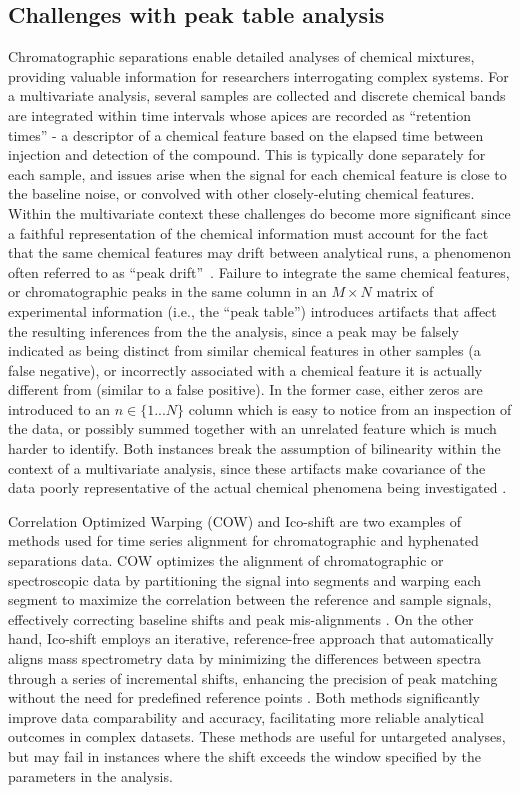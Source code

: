 \documentclass[preprint,12pt]{elsarticle}
\begin{document}
\subsection{Challenges with peak table analysis}
Chromatographic separations enable detailed analyses of chemical mixtures, providing valuable information for researchers interrogating complex systems. For a multivariate analysis, several samples are collected and discrete chemical bands are integrated within time intervals whose apices are recorded as ``retention times'' - a descriptor of a chemical feature based on the elapsed time between injection and detection of the compound. This is typically done separately for each sample, and issues arise when the signal for each chemical feature is close to the baseline noise, or convolved with other closely-eluting chemical features. Within the multivariate context these challenges do become more significant since a faithful representation of the chemical information must account for the fact that the same chemical features may drift between analytical runs, a phenomenon often referred to as ``peak drift''~\cite{christensen2005chromatographic}. Failure to integrate the same chemical features, or chromatographic peaks in the same column in an $M \times N$ matrix of experimental information (i.e., the ``peak table'') introduces artifacts that affect the resulting inferences from the the analysis, since a peak may be falsely indicated as being distinct from similar chemical features in other samples (a false negative), or incorrectly associated with a chemical feature it is actually different from (similar to a false positive). In the former case, either zeros are introduced to an $n \in \{1...N\}$ column which is easy to notice from an inspection of the data, or possibly summed together with an unrelated feature which is much harder to identify. Both instances break the assumption of bilinearity within the context of a multivariate analysis, since these artifacts make covariance of the data poorly representative of the actual chemical phenomena being investigated \cite{armstrong2023parafac2,de2012integration}. 

Correlation Optimized Warping (COW) and Ico-shift are two examples of methods used for time series alignment for chromatographic and hyphenated separations data. COW optimizes the alignment of chromatographic or spectroscopic data by partitioning the signal into segments and warping each segment to maximize the correlation between the reference and sample signals, effectively correcting baseline shifts and peak mis-alignments \cite{trygg2007correlation}. On the other hand, Ico-shift employs an iterative, reference-free approach that automatically aligns mass spectrometry data by minimizing the differences between spectra through a series of incremental shifts, enhancing the precision of peak matching without the need for predefined reference points \cite{schindler2015icoshift}. Both methods significantly improve data comparability and accuracy, facilitating more reliable analytical outcomes in complex datasets. These methods are useful for untargeted analyses, but may fail in instances where the shift exceeds the window specified by the parameters in the analysis. 
\end{document}
